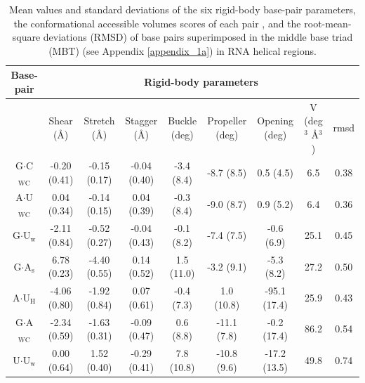 \begin{table}
\begin{center}
\begin{tabular}{|c|c|c|c|c|c|c|c|c|}
\hline
Base-pair & \multicolumn{8}{c|}{Rigid-body parameters} \\
\hline
 & Shear (\AA) & Stretch (\AA) & Stagger (\AA) & Buckle (deg) &
Propeller (deg) & Opening (deg) & V (deg$^{\text{3}}$
\AA$^{\text{3}}$) & rmsd \\
\hline
G$\cdot$C$_{\text{WC}}$ & -0.20 (0.41) & -0.15 (0.17) & -0.04 (0.40) & -3.4 (8.4)  &  -8.7  (8.5) &  0.5  (4.5)  & 6.5   & 0.38\\
A$\cdot$U$_{\text{WC}}$ &  0.04 (0.34) & -0.14 (0.15) &  0.04 (0.39) & -0.3 (8.4)  &  -9.0  (8.7) &  0.9  (5.2)  & 6.4   & 0.36\\
G$\cdot$U$_{\text{w}}$  & -2.11 (0.84) & -0.52 (0.27) & -0.04 (0.43) & -0.1 (8.2)  &  -7.4  (7.5) & -0.6  (6.9)  & 25.1  & 0.45\\
G$\cdot$A$_{\text{s}}$  &  6.78 (0.23) & -4.40 (0.55) &  0.14 (0.52) &  1.5 (11.0) &  -3.2  (9.1) & -5.3  (8.2)  & 27.2  & 0.50\\
A$\cdot$U$_{\text{H}}$  & -4.06 (0.80) & -1.92 (0.84) &  0.07 (0.61) & -0.4 (7.3)  &   1.0 (10.8) & -95.1 (17.4) & 25.9  & 0.43\\
G$\cdot$A$_{\text{WC}}$ & -2.34 (0.59) & -1.63 (0.31) & -0.09 (0.47) &  0.6 (8.8)  & -11.1  (7.8) & -0.2  (17.4) & 86.2  & 0.54\\
U$\cdot$U$_{\text{w}}$  &  0.00 (0.64) &  1.52 (0.40) & -0.29 (0.41) &  7.8 (10.8) & -10.8  (9.6) & -17.2 (13.5) & 49.8  & 0.74\\
\hline
\end{tabular}
\caption{Mean  values and  standard deviations  of the  six rigid-body
  base-pair parameters,  the conformational accessible  volumes scores
  of each  pair \cite{olson1998},  and the root-mean-square deviations
  (RMSD) of base pairs superimposed in the middle base triad (MBT)
  (see Appendix \ref{appendix_1a}) in RNA helical regions.}
\label{tab:bppar}
\end{center}
\end{table}




